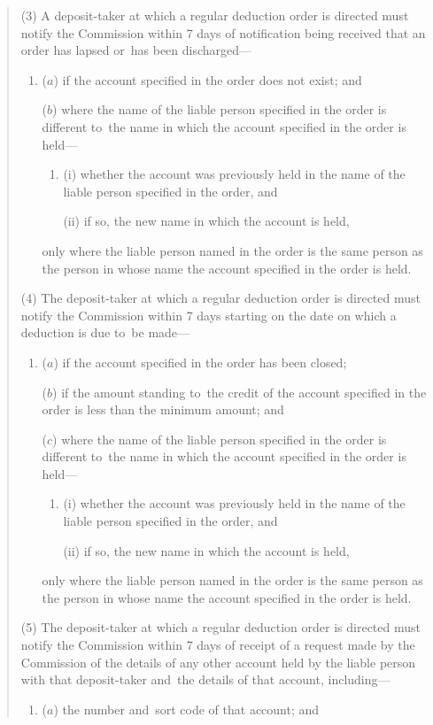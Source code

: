 \documentclass[12pt,a4paper]{article}
\begin{document}
\begin{quotation}
(3) A deposit-taker at which a regular deduction order is directed must notify the Commission within 7 days of notification being received that an order has lapsed or~has been discharged—
\begin{enumerate}\item[]
($a$) if the account specified in the order does not exist; and

($b$) where the name of the liable person specified in the order is different to~the name in which the account specified in the order is held—
\begin{enumerate}\item[]
(i) whether the account was previously held in the name of the liable person specified in the order, and

(ii) if so, the new name in which the account is held,
\end{enumerate}
only where the liable person named in the order is the same person as the person in whose name the account specified in the order is held.
\end{enumerate}

(4) The deposit-taker at which a regular deduction order is directed must notify the Commission within 7 days starting on the date on which a deduction is due to~be made—
\begin{enumerate}\item[]
($a$) if the account specified in the order has been closed;

($b$) if the amount standing to~the credit of the account specified in the order is less than the minimum amount; and

($c$) where the name of the liable person specified in the order is different to~the name in which the account specified in the order is held—
\begin{enumerate}\item[]
(i) whether the account was previously held in the name of the liable person specified in the order, and

(ii) if so, the new name in which the account is held,
\end{enumerate}
only where the liable person named in the order is the same person as the person in whose name the account specified in the order is held.
\end{enumerate}

(5) The deposit-taker at which a regular deduction order is directed must notify the Commission within 7 days of receipt of a request made by the Commission of the details of any other account held by the liable person with that deposit-taker and~the details of that account, including—
\begin{enumerate}\item[]
($a$) the number and~sort code of that account; and


\end{enumerate}
\end{quotation}
\end{document}
